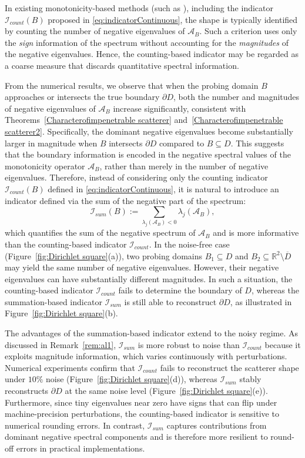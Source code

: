 \documentclass[11pt,reqno,twoside]{amsart}
\theoremstyle{definition}
\theoremstyle{remark}
\numberwithin{equation}{section}
\begin{document}
In existing monotonicity-based methods (such as \cite{AG20,AG23}), including the indicator $\mathcal{I}_{count}(B)$ proposed in \eqref{eq:indicatorContinuous}, the shape is typically identified by counting the number of negative eigenvalues of $\mathcal{A}_{B}$. Such a criterion uses only the \emph{sign} information of the spectrum without accounting for the \emph{magnitudes} of the negative eigenvalues. Hence, the counting-based indicator may be regarded as a coarse measure that discards quantitative spectral information.

From the numerical results, we observe that when the probing domain $B$ approaches or intersects the true boundary $\partial D$, both the number and magnitudes of negative eigenvalues of $\mathcal{A}_B$ increase significantly, consistent with Theorems~\ref{Characterofimpenetrable scatterer} and~\ref{Characterofimpenetrable scatterer2}. Specifically, the dominant negative eigenvalues become substantially larger in magnitude when $B$ intersects $\partial D$ compared to $B \subseteq D$. This suggests that the boundary information is encoded in the negative spectral values of the monotonicity operator $\mathcal A_B$, rather than merely in the number of negative eigenvalues. Therefore, instead of considering only the counting indicator $\mathcal I_{count}(B)$ defined in \eqref{eq:indicatorContinuous}, it is natural to introduce an indicator defined via the sum of the negative part of the spectrum:
$$
\mathcal{I}_{sum}(B) := \sum_{\lambda_j(\mathcal{A}_B)<0} \lambda_j(\mathcal{A}_B),
$$
which quantifies the sum of the negative spectrum of \(\mathcal{A}_B\) and is more informative than the counting-based indicator \(\mathcal I_{count}\). In the noise-free case (Figure~\ref{fig:Dirichlet square}(a)), two probing domains $B_1 \subseteq D$ and $B_2 \subseteq \mathbb{R}^2 \setminus \overline{D}$ may yield the same number of negative eigenvalues. However, their negative eigenvalues can have substantially different magnitudes. In such a situation, the counting-based indicator \(\mathcal I_{count}\) fails to determine the boundary of $D$, whereas the summation-based indicator $\mathcal I_{sum}$ is still able to reconstruct $\partial D$, as illustrated in Figure~\ref{fig:Dirichlet square}(b).

The advantages of the summation-based indicator extend to the noisy regime. As discussed in Remark~\ref{rem:al1}, $\mathcal{I}_{sum}$ is more robust to noise than $\mathcal{I}_{count}$ because it exploits magnitude information, which varies continuously with perturbations. Numerical experiments confirm that $\mathcal{I}_{count}$ fails to reconstruct the scatterer shape under $10\%$ noise (Figure~\ref{fig:Dirichlet square}(d)), whereas $\mathcal{I}_{sum}$ stably reconstructs $\partial D$ at the same noise level (Figure~\ref{fig:Dirichlet square}(e)). Furthermore, since tiny eigenvalues near zero have signs that can flip under machine-precision perturbations, the counting-based indicator is sensitive to numerical rounding errors. In contrast, $\mathcal{I}_{sum}$ captures contributions from dominant negative spectral components and is therefore more resilient to round-off errors in practical implementations.
\end{document}
